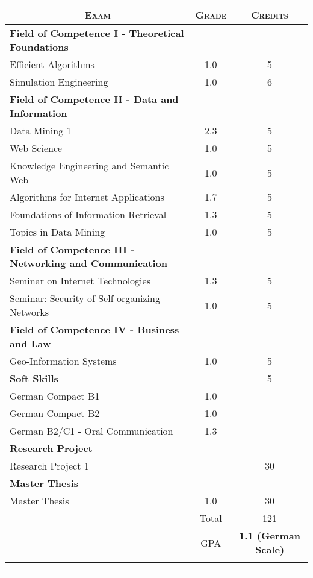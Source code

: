 \documentclass[a4paper,10pt]{article} %
\begin{document}
\begin{center}
\begin{tabular}{lcc}
\multicolumn{1}{c}{\textsc{Exam}} & \textsc{Grade}&\textsc{Credits}\\ \hline
\textbf{Field of Competence I - Theoretical Foundations}\\
Efficient Algorithms & 1.0 & 5\\
Simulation Engineering & 1.0 & 6\\ 

\textbf{Field of Competence II - Data and Information}\\
Data Mining 1 & 2.3 & 5\\
Web Science & 1.0 & 5\\
Knowledge Engineering and Semantic Web & 1.0 & 5\\
Algorithms for Internet Applications & 1.7 & 5\\
Foundations of Information Retrieval & 1.3 & 5\\
Topics in Data Mining & 1.0 & 5\\ 

\textbf{Field of Competence III - Networking and Communication}\\
Seminar on Internet Technologies & 1.3 & 5\\
Seminar: Security of Self-organizing Networks & 1.0 & 5\\ 

\textbf{Field of Competence IV - Business and Law}\\
Geo-Information Systems & 1.0 & 5\\ 

\textbf{Soft Skills} & & 5\\
German Compact B1 & 1.0 &\\ 
German Compact B2 & 1.0 &\\ 
German B2/C1 - Oral Communication & 1.3 &\\  

\textbf{Research Project}\\
Research Project 1 & & 30\\

\textbf{Master Thesis}\\
Master Thesis & 1.0 & 30\\

& Total & 121\\\cline{2-3}
&\textsc{GPA}&\textbf{1.1 (German Scale)}\\ 
&&%
\end{tabular}
\end{center}
\bigskip
\hrule
\bigskip
\end{document}
